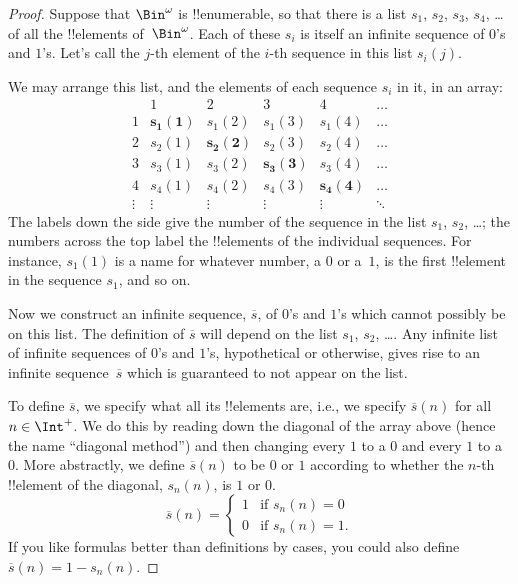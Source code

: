\documentclass[../../../include/open-logic-section]{subfiles}
\begin{document}
\begin{proof}
Suppose that $\Bin^\omega$ is !!{enumerable}, so that there is a list
$s_{1}$, $s_{2}$, $s_{3}$, $s_{4}$, \dots{} of all the !!{element}s
of~$\Bin^\omega$.  Each of these $s_i$ is itself an infinite sequence
of $0$'s and $1$'s.  Let's call the $j$-th element of the $i$-th
sequence in this list $s_i(j)$.

We may arrange this list, and the elements of each sequence $s_i$ in
it, in an array:
\[
\begin{array}{c|c|c|c|c|c}
& 1 & 2 & 3 & 4 & \dots \\\hline
1 & \mathbf{s_{1}(1)} & s_{1}(2) & s_{1}(3) & s_1(4) & \dots \\\hline
2 & s_{2}(1)& \mathbf{s_{2}(2)} & s_2(3) & s_2(4) & \dots \\\hline
3 & s_{3}(1)& s_{3}(2) & \mathbf{s_3(3)} & s_3(4) & \dots \\\hline
4 & s_{4}(1)& s_{4}(2) & s_4(3) & \mathbf{s_4(4)} & \dots \\\hline
\vdots & \vdots & \vdots & \vdots & \vdots & \mathbf{\ddots}
\end{array}
\]
The labels down the side give the number of the sequence in the list
$s_1$, $s_2$, \dots; the numbers across the top label the !!{element}s
of the individual sequences. For instance, $s_{1}(1)$ is a name for
whatever number, a $0$ or a~$1$, is the first !!{element} in the
sequence $s_{1}$, and so on.

Now we construct an infinite sequence, $\overline{s}$, of $0$'s and
$1$'s which cannot possibly be on this list.  The definition of
$\overline{s}$ will depend on the list $s_1$, $s_2$, \dots.  Any
infinite list of infinite sequences of $0$'s and $1$'s, hypothetical
or otherwise, gives rise to an infinite sequence~$\overline{s}$ which
is guaranteed to not appear on the list.

To define $\overline{s}$, we specify what all its !!{element}s are,
i.e., we specify $\overline{s}(n)$ for all $n \in \Int^+$.  We do this
by reading down the diagonal of the array above (hence the name
``diagonal method'') and then changing every $1$ to a $0$ and every
$1$ to a~$0$. More abstractly, we define $\overline{s}(n)$ to be $0$
or $1$ according to whether the $n$-th !!{element} of the diagonal,
$s_n(n)$, is $1$ or $0$.
\[
\overline{s}(n) =
\begin{cases}
1 & \text{if $s_{n}(n) = 0$}\\
0 & \text{if $s_{n}(n) = 1$}.
\end{cases}
\]
If you like formulas better than definitions by cases, you could also
define $\overline{s}(n) = 1 - s_n(n)$.


\end{proof}
\end{document}
